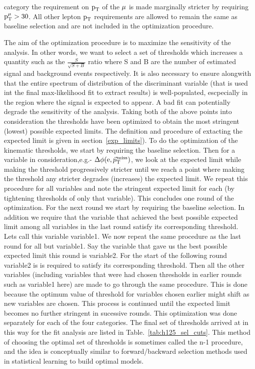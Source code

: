 category the requirement on $\text{p}_\text{T}$ of the $\mu$ is made marginally stricter by requiring  $\text{p}_\text{T}^{\mu} > 30$\GeV. All other lepton $\text{p}_\text{T}$ requirements are allowed to remain the same as baseline selection and are not included in the optimization procedure.   

The aim of the optimization procedure is to maximize the sensitivity of the analysis. In other words, we want to select a set of thresholds which increases a quantity such as the $\frac{S}{\sqrt{S+B}}$ ratio where S and B are the number of estimated signal and background events respectively. It is also necessary to ensure alongwith that the entire spectrum of distribution of the discriminant variable (that is used int the final max-likelihood fit to extract results) is well-populated, escpecially in the region where the signal is expected to appear. A bad fit can potentially degrade the sensitivity of the analysis. Taking both of the above points into consideration the thresholds have been optimized to obtain the most stringent (lowest) possible expected limits. The definition and procedure of extacting the expected limit is given in section~\ref{exp_limits}). To do the optimization of the kinematic thresholds, we start by requiring the baseline selection. Then for a variable in consideration,e.g.- $\Delta\phi(\text{e}, {\vec p}_{\mathrm{T}}^{\kern1pt\text{miss}})$, we look at the expected limit while making the threshold progressively stricter until we reach a point where making the threshold any stricter degrades (increases) the expected limit. We repeat this procedure for all variables and note the stringent expected limit for each (by tightening thresholds of only that variable). This concludes one round of the optimization. For the next round we start by requiring the baseline selection. In addition we require that the variable that achieved the best possible expected limit among all variables in the last round satisfy its corresponding threshold. Lets call this variable variable1. We now repeat the same procedure as the last round for all but variable1. Say the variable that gave us the best possible expected limit this round is variable2. For the start of the following round variable2 is is required to satisfy its corresponding threshold. Then all the other variables (including variables that were had chosen thresholds in earlier rounds such as variable1 here) are made to go through the same procedure. This is done because the optimum value of threshold for variables chosen earlier might shift as new variables are chosen. This process is continued until the expected limit becomes no further stringent in sucessive rounds. This optimization was done separately for each of the four categories. The final set of thresholds arrived at in this way for the \hmue \mcol fit analysis are listed in Table.~\ref{tab:h125_sel_cuts}. This method of choosing the optimal set of thresholds is sometimes called the n-1 procedure, and the idea is conceptually similar to forward/backward selection methods used in statistical learning to build optimal models.             


